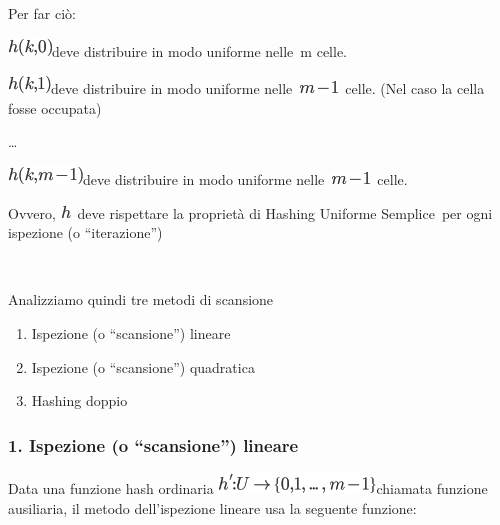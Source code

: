 \documentclass{article}
\providecommand{\tightlist}{%
  \setlength{\itemsep}{0pt}\setlength{\parskip}{0pt}}
\begin{document}
{Per far ciò:}

\includegraphics{images/image282.png}{deve distribuire in modo uniforme
nelle}{~m }{celle.}

\includegraphics{images/image283.png}{deve distribuire in modo uniforme
nelle}{~}\includegraphics{images/image284.png}{~}{celle. (Nel caso la
cella fosse occupata)}

{\ldots{}}

\includegraphics{images/image285.png}{deve distribuire in modo uniforme
nelle}{~}\includegraphics{images/image284.png}{~}{celle.}

{}

{Ovvero, }\includegraphics{images/image89.png}{~}{deve rispettare la
proprietà di Hashing Uniforme Semplice}{~per ogni ispezione (o
``iterazione'') }

{~}

{Analizziamo quindi tre metodi di scansione}

{}

\begin{enumerate}
\tightlist
\item
  {Ispezione (o ``scansione'') lineare}
\item
  {Ispezione (o ``scansione'') quadratica}
\item
  {Hashing doppio}
\end{enumerate}

{}

\hypertarget{h.i6sv1bn6gjla}{\subsubsection{\texorpdfstring{{1.
}{Ispezione (o ``scansione'')
lineare}}{1. Ispezione (o scansione) lineare}}\label{h.i6sv1bn6gjla}}

{Data una funzione hash ordinaria
}\includegraphics{images/image286.png}{chiamata funzione ausiliaria, il
metodo dell'ispezione lineare usa la seguente funzione:}
\end{document}
